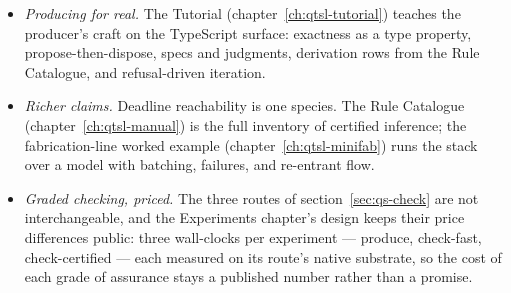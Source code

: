 \begin{itemize}
\item \emph{Producing for real.} The Tutorial
  (chapter~\ref{ch:qtsl-tutorial}) teaches the producer's craft on the
  TypeScript surface: exactness as a type property, propose-then-dispose,
  specs and judgments, derivation rows from the Rule Catalogue, and
  refusal-driven iteration.
\item \emph{Richer claims.} Deadline reachability is one species. The
  Rule Catalogue (chapter~\ref{ch:qtsl-manual}) is the full inventory
  of certified inference; the fabrication-line worked example
  (chapter~\ref{ch:qtsl-minifab}) runs the stack over a model with
  batching, failures, and re-entrant flow.
\item \emph{Graded checking, priced.} The three routes of
  section~\ref{sec:qs-check} are not interchangeable, and the
  Experiments chapter's design keeps their price differences public:
  three wall-clocks per experiment --- produce, check-fast,
  check-certified --- each measured on its route's native substrate,
  so the cost of each grade of assurance stays a published number
  rather than a promise.
\end{itemize}

